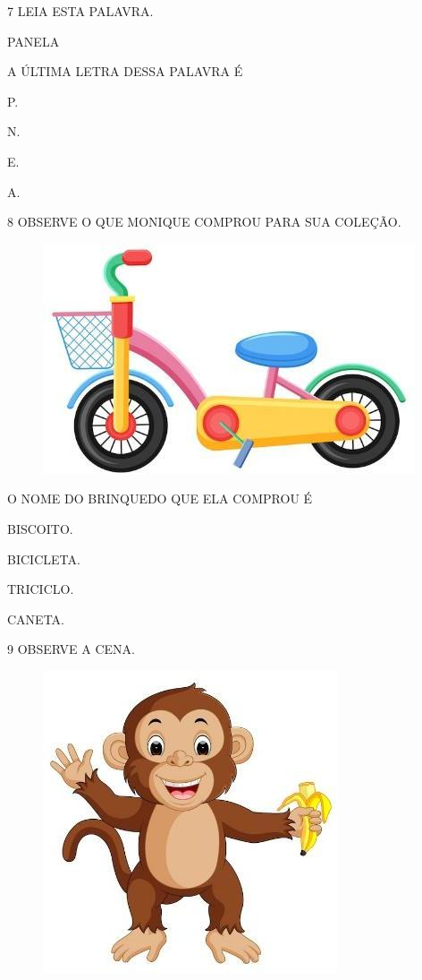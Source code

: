 \num{7} LEIA ESTA PALAVRA.

\begin{myquote}
\centering\large{PANELA}
\end{myquote}

A ÚLTIMA LETRA DESSA PALAVRA É

\begin{escolha}
\item P.

\item N.

\item E.

\item A.
\end{escolha}


\num{8} OBSERVE O QUE MONIQUE COMPROU PARA SUA COLEÇÃO.

\begin{figure}[H]
\centering
\includegraphics[width=.3\textwidth]{media/image217.jpg}
\end{figure}

O NOME DO BRINQUEDO QUE ELA COMPROU É

\begin{escolha}
\item BISCOITO.

\item BICICLETA.

\item TRICICLO.

\item CANETA.
\end{escolha}

\num{9} OBSERVE A CENA.

\begin{figure}[H]
\centering
\includegraphics[width=.3\textwidth]{media/image218.jpg}
\end{figure}

